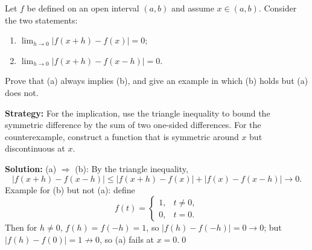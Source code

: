 \begin{problembox}
\begin{problemstatement}
Let $f$ be defined on an open interval $(a, b)$ and assume $x \in (a, b)$. Consider the two statements:
\begin{enumerate}[label=(\alph*)]
\item $\lim_{h \to 0} |f(x + h) - f(x)| = 0$;
\item $\lim_{h \to 0} |f(x + h) - f(x - h)| = 0$.
\end{enumerate}
Prove that (a) always implies (b), and give an example in which (b) holds but (a) does not.
\end{problemstatement}
\end{problembox}

\noindent\textbf{Strategy:} For the implication, use the triangle inequality to bound the symmetric difference by the sum of two one-sided differences. For the counterexample, construct a function that is symmetric around $x$ but discontinuous at $x$.

\bigskip\noindent\textbf{Solution:}
(a) $\Rightarrow$ (b): By the triangle inequality,
\[
|f(x+h)-f(x-h)|\le |f(x+h)-f(x)|+|f(x)-f(x-h)|\to 0.
\]
Example for (b) but not (a): define
\[
f(t)=\begin{cases}
1,& t\ne 0,\\
0,& t=0.
\end{cases}
\]
Then for $h\ne 0$, $f(h)=f(-h)=1$, so $|f(h)-f(-h)|=0\to 0$; but $|f(h)-f(0)|=1\not\to 0$, so (a) fails at $x=0$.\qed



